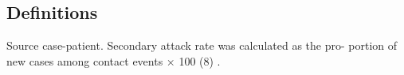 \subsection{Definitions}
Source case-patient. Secondary attack rate was calculated as the pro- portion of new cases among contact events × 100 (8) \cite{Dixon2015}.